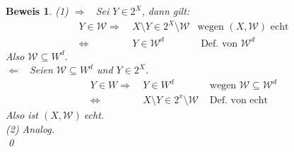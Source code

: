 \documentclass[ngerman]{scrartcl}
\theoremstyle{custom}
\newtheorem*{bw}{Beweis}
\newcommand{\0}{\mathbf{0}}
\newcommand{\1}{\mathbf{L}}
\newcommand{\sg}{$(X,\mathcal{W})~$}
\newcommand{\W}{\mathcal{W}}
\begin{document}
\begin{bw}
(1) \glqq $\Rightarrow$\grqq~ Sei $Y \in 2^X$, dann gilt:
\begin{align*}
Y \in \W \Rightarrow&~ X \setminus Y \in 2^X \setminus \W & \text{
  wegen } (X,\W)
\text{ echt}\\
\Leftrightarrow&~ Y \in \W^d & \text{ Def. von } \W^d
\end{align*}
Also $\W \subseteq W^d$.\\
\glqq $\Leftarrow$\grqq~ Seien $\W \subseteq W^d$ und $Y \in 2^X$.
\begin{align*}
Y \in W \Rightarrow&~ Y \in W^d & \text{ wegen } \W \subseteq \W^d\\
\Leftrightarrow&~ X \setminus Y \in 2^x \setminus \W & \text{ Def. von
 echt}
\end{align*}
Also ist \sg echt.\\

(2) Analog.\\

\qed
\end{bw}
\end{document}
